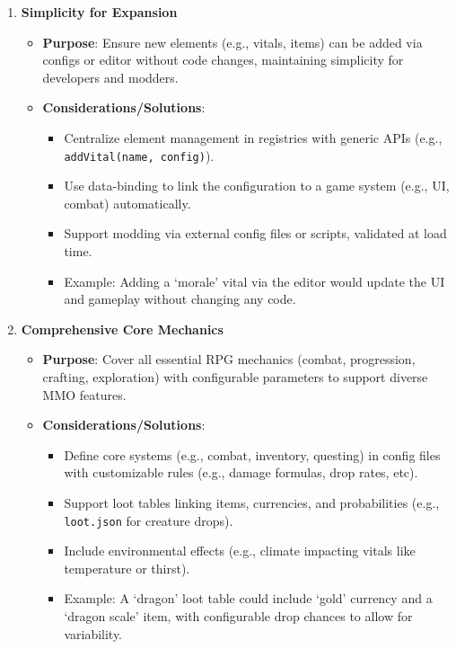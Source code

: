 \begin{enumerate}
    \item \textbf{Simplicity for Expansion}
        \begin{itemize}
            \item \textbf{Purpose}: Ensure new elements (e.g., vitals, items) can be added via configs or editor without code changes, maintaining simplicity for developers and modders.
            \item \textbf{Considerations/Solutions}:
                \begin{itemize}
                    \item Centralize element management in registries with generic APIs (e.g., \texttt{addVital(name, config)}).
                    \item Use data-binding to link the configuration to a game system (e.g., UI, combat) automatically.
                    \item Support modding via external config files or scripts, validated at load time.
                    \item Example: Adding a `morale' vital via the editor would update the UI and gameplay without changing any code.
                \end{itemize}
        \end{itemize}

    \item \textbf{Comprehensive Core Mechanics}
        \begin{itemize}
            \item \textbf{Purpose}: Cover all essential RPG mechanics (combat, progression, crafting, exploration) with configurable parameters to support diverse MMO features.
            \item \textbf{Considerations/Solutions}:
                \begin{itemize}
                    \item Define core systems (e.g., combat, inventory, questing) in config files with customizable rules (e.g., damage formulas, drop rates, etc).
                    \item Support loot tables linking items, currencies, and probabilities (e.g., \texttt{loot.json} for creature drops).
                    \item Include environmental effects (e.g., climate impacting vitals like temperature or thirst).
                    \item Example: A `dragon' loot table could include `gold' currency and a `dragon scale' item, with configurable drop chances to allow for variability.
                \end{itemize}
        \end{itemize}


\end{enumerate}
